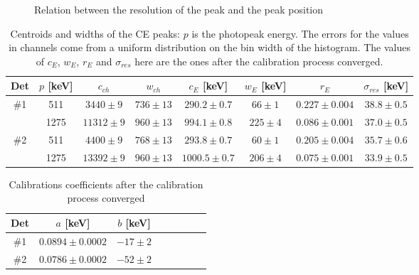 \documentclass[11pt,a4 paper]{article}
\begin{document}
\begin{figure}[H]
    \centering
    \caption{Relation between the resolution of the peak and the peak position}
    \label{fig:sim}
\end{figure}


\begin{table}[H]
  \centering
  \begin{tabular}{cccccccc}
    \toprule
    Det & $p$ [keV] & $c_{ch}$ & $w_{ch}$ & $c_E$ [keV] & $w_E$ [keV] & $r_E$ & $\sigma_{res}$ [keV]\\
    \midrule
    \#1 & 511 & $3440 \pm 9$ & $736 \pm 13$ & $290.2 \pm 0.7$ & $66 \pm 1$ & $0.227 \pm 0.004$ & $38.8 \pm 0.5$ \\
        & 1275 & $11312 \pm 9$ & $960 \pm 13$ & $994.1 \pm 0.8$ & $225 \pm 4$ & $0.086 \pm 0.001$ & $37.0 \pm 0.5$ \\
    \#2 & 511 & $4400 \pm 9$ & $768 \pm 13$ & $293.8 \pm 0.7$ & $60 \pm 1$ & $0.205 \pm 0.004$ & $35.7 \pm 0.6$ \\
        & 1275 & $13392 \pm 9$ & $960 \pm 13$ & $1000.5 \pm 0.7$ & $206 \pm 4$ & $0.075 \pm 0.001$ & $33.9 \pm 0.5$ \\
    \bottomrule
  \end{tabular}
  \caption{Centroids and widths of the CE peaks: $p$ is the photopeak energy. The errors for the values in channels come from a uniform distribution on the bin width of the histogram. The values of $c_E$, $w_E$, $r_E$ and $\sigma_{res}$ here are the ones after the calibration process converged.}
  \label{tab:calibr:fits}
\end{table}

\begin{table}[H]
  \centering
  \begin{tabular}{cccccccc}
    \toprule
    Det & $a$ [keV] & $b$ [keV] \\
    \midrule
    \#1 & $0.0894 \pm 0.0002$ & $-17 \pm 2$ \\
    \#2 & $0.0786 \pm 0.0002$ & $-52 \pm 2$ \\
    \bottomrule
  \end{tabular}
  \caption{Calibrations coefficients after the calibration process converged}
  \label{tab:calibr:coeffs}
\end{table}
\end{document}
